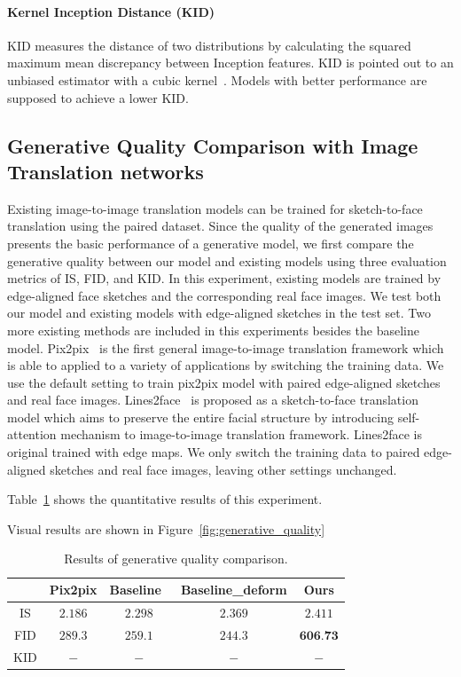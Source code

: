 \paragraph{Kernel Inception Distance (KID)}
KID measures the distance of two distributions by calculating the squared maximum mean discrepancy between Inception features. KID is pointed out to an unbiased estimator with a cubic kernel~\cite{KID}. Models with better performance are supposed to achieve a lower KID.

\subsection{Generative Quality Comparison with Image Translation networks}

Existing image-to-image translation models can be trained for sketch-to-face translation using the paired dataset. 
Since the quality of the generated images presents the basic performance of a generative model, we first compare the generative quality between our model and existing models using three evaluation metrics of IS, FID, and KID. In this experiment, existing models are trained by edge-aligned face sketches and the corresponding real face images. 
We test both our model and existing models with edge-aligned sketches in the test set. Two more existing methods are included in this experiments besides the baseline model. Pix2pix~\cite{pix2pix} is the first general image-to-image translation framework which is able to applied to a variety of applications by switching the training data. We use the default setting to train pix2pix model with paired edge-aligned sketches and real face images. Lines2face~\cite{Lines2Face} is proposed as a sketch-to-face translation model which aims to preserve the entire facial structure by introducing self-attention mechanism to image-to-image translation framework. Lines2face is original trained with edge maps. We only switch the training data to paired edge-aligned sketches and real face images, leaving other settings unchanged.

Table~\ref{tab:generative_quality} shows the quantitative results of this experiment. 

Visual results are shown in Figure~\ref{fig:generative_quality}

\begin{table}[h]
	\centering	
	\caption{Results of generative quality comparison.}
	\begin{tabular}{|c|c|c|c|c|}\hline
		& Pix2pix \cite{pix2pix} & Baseline~\cite{pix2pixHD} & Baseline\_deform & Ours \\\hline
		IS & $2.186$ & $2.298$ & $2.369$ & $2.411$\\\hline
		FID & $289.3$ & $259.1$ & $244.3$ & $\textbf{606.73}$\\\hline
		KID & $-$ & $-$ & $-$ & $-$\\\hline
	\end{tabular}
	\label{tab:generative_quality}
\end{table} 

